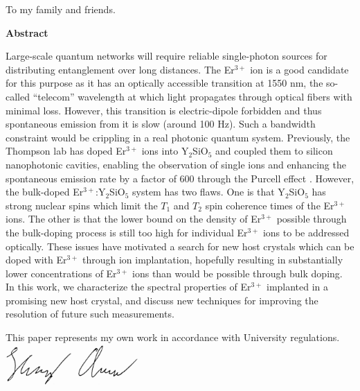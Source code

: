 \documentclass[12pt]{report}
\newcommand{\erbium}[1][ ]{Er$^{3+}$#1}
\newcommand{\YSO}[1][ ]{Y$_{2}$SiO$_{5}$#1}
\newcommand{\ErYSO}[1][ ]{Er$^{3+}$:Y$_{2}$SiO$_{5}$#1}
\begin{document}
\newpage
\thispagestyle{empty}
\vspace*{1in}
\begin{flushright}
  To my family and friends.
\end{flushright}
\clearpage
\newpage
\newpage
\thispagestyle{empty}
\onehalfspacing
\vspace*{1cm}
\begin{center}
  \textbf{Abstract}
\end{center}
  \noindent Large-scale quantum networks will require reliable single-photon sources for distributing entanglement over long distances. The \erbium ion is a good candidate for this purpose as it has an optically accessible transition at 1550 nm, the so-called ``telecom'' wavelength at which light propagates through optical fibers with minimal loss. However, this transition is electric-dipole forbidden and thus spontaneous emission from it is slow (around 100 Hz).
  Such a bandwidth constraint would be crippling in a real photonic quantum system. Previously, the Thompson lab has doped \erbium ions into \YSO and coupled them to silicon nanophotonic cavities, enabling the observation of single ions and enhancing the spontaneous emission rate by a factor of 600 through the Purcell effect \cite{Dibos2018}.
  However, the bulk-doped \ErYSO system has two flaws. One is that \YSO has strong nuclear spins which limit the  $T_{1}$ and $T_{2}$ spin coherence times of the \erbium ions. The other is that the lower bound on the density of \erbium possible through the bulk-doping process is still too high for individual \erbium ions to be addressed optically.
  These issues have motivated a search for new host crystals which can be doped with \erbium through ion implantation, hopefully resulting in substantially lower concentrations of \erbium ions than would be possible through bulk doping. In this work, we characterize the spectral properties of \erbium implanted in a promising new host crystal, and discuss new techniques for improving the resolution of future such measurements.
  
\vspace*{\fill}
\begin{center}
  This paper represents my own work in accordance with University regulations.\\
  \includegraphics[width=2in]{Signature}
\end{center}
\vspace*{\fill}
\clearpage
\newpage
\doublespacing
\end{document}
